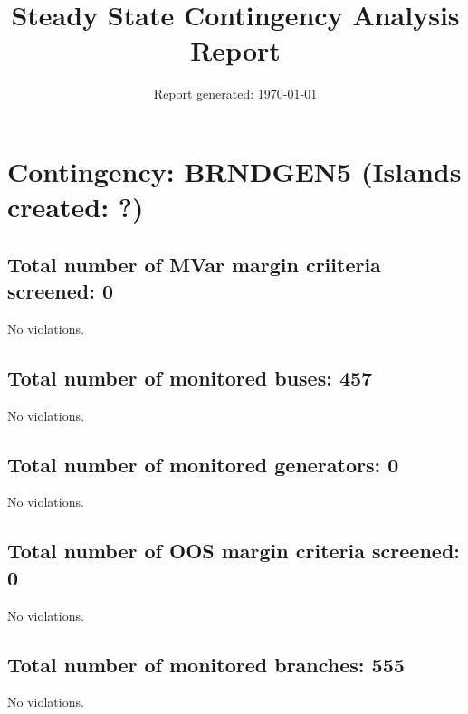 \documentclass{article}%
\title{Steady State Contingency Analysis Report\vspace{-3ex}}%
\date{Report generated: \today\vspace{-2ex}}%
\begin{document}
%
\normalsize%
\maketitle%
\section*{Contingency: BRNDGEN5 (Islands created: ?)}%
\label{sec:ContingencyBRNDGEN5(Islandscreated?)}%
\subsection*{Total number of MVar margin criiteria screened: 0}%
\label{subsec:TotalnumberofMVarmargincriiteriascreened0}%
No violations.

%
\subsection*{Total number of monitored buses: 457}%
\label{subsec:Totalnumberofmonitoredbuses457}%
No violations.

%
\subsection*{Total number of monitored generators: 0}%
\label{subsec:Totalnumberofmonitoredgenerators0}%
No violations.

%
\subsection*{Total number of OOS margin criteria screened: 0}%
\label{subsec:TotalnumberofOOSmargincriteriascreened0}%
No violations.

%
\subsection*{Total number of monitored branches: 555}%
\label{subsec:Totalnumberofmonitoredbranches555}%
No violations.

%
\end{document}
